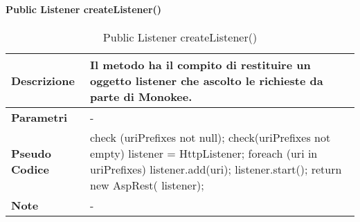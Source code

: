 \paragraph{Public Listener createListener()}
\begin{center}
    \begin{longtable}{|p{3cm}|p{9cm}|}%
    \caption{Public Listener createListener()}
    \label{tab:public-listner-createListener}
    \endfirsthead
    \endhead
    \hline
    \textbf{Descrizione} & Il metodo ha il compito di restituire un oggetto listener che ascolto le richieste da parte di Monokee.  \\
    \hline
    \textbf{Parametri} &      
        -
    \\
    \hline
    \textbf{Pseudo Codice} & 
        check (uriPrefixes not null); \newline
        check(uriPrefixes not empty) \newline
        listener = HttpListener; \newline
        foreach (uri in uriPrefixes) {
            listener.add(uri); \newline
        }
        listener.start(); \newline
        return new AspRest( listener); \newline
    \\
    \hline
    \textbf{Note} & - \\
    \hline
    \end{longtable}
    \end{center}


